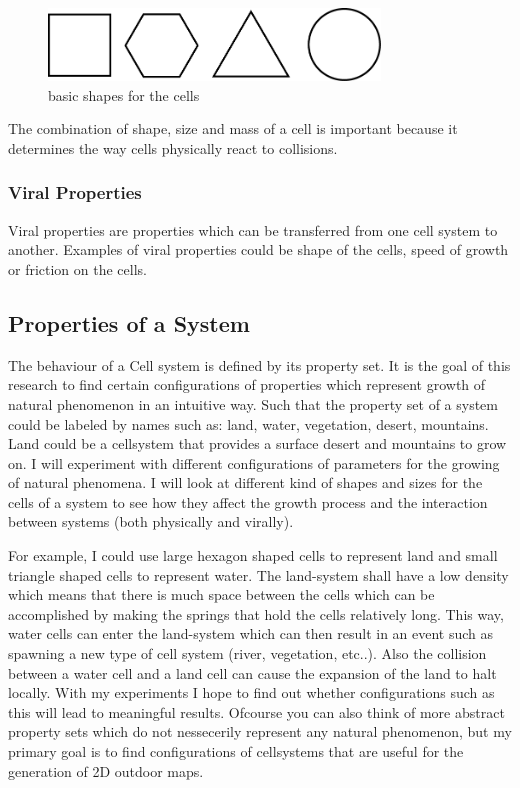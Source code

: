\documentclass{article}
\begin{document}
\begin{figure}[h,t]
\centering
  \begin{center}

	\includegraphics[width=250pt]{images/shapes.png}
\end{center}
	\caption{basic shapes for the cells}
\end{figure}


The combination of shape, size and mass of a cell is important because it determines the way cells physically react to collisions.

\subsubsection{Viral Properties}

Viral properties are properties which can be transferred from one cell system to another. Examples of viral properties could be shape of the cells, speed of growth or friction on the cells. 

\subsection{Properties of a System}

The behaviour of a Cell system is defined by its property set. 
It is the goal of this research to find certain configurations of properties which represent growth of natural phenomenon in an intuitive way. Such that the property set of a system could be labeled by names such as: land, water, vegetation, desert, mountains. Land could be a cellsystem that provides a surface desert and mountains to grow on. I will experiment with different configurations of parameters for the growing of natural phenomena. I will look at different kind of shapes and sizes for the cells of a system to see how they affect the growth process and the interaction between systems (both physically and virally). 

For example, I could use large hexagon shaped cells to represent land and small triangle shaped cells to represent water. The land-system shall have a low density which means that there is much space between the cells which can be accomplished by making the springs that hold the cells relatively long. This way, water cells can enter the land-system which can then result in an event such as spawning a new type of cell system (river, vegetation, etc..). Also the collision between a water cell and a land cell can cause the expansion of the land to halt locally. With my experiments I hope to find out whether configurations such as this will lead to meaningful results. Ofcourse you can also think of more abstract property sets which do not nessecerily represent any natural phenomenon, but my primary goal is to find configurations of cellsystems that are useful for the generation of 2D outdoor maps.  
\end{document}
